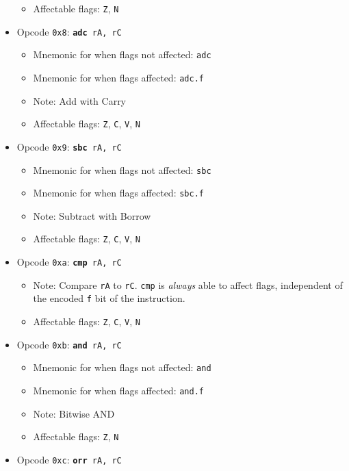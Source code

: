 \documentclass{article}
\begin{document}
\begin{itemize}
\begin{itemize}
			\item Affectable flags:
				\texttt{Z}, \texttt{N}
		\end{itemize}
		\item Opcode \texttt{0x8}:
			\texttt{\textbf{adc} rA, rC}
		\begin{itemize}
			\item Mnemonic for when flags not affected:  \texttt{adc}
			\item Mnemonic for when flags affected:  \texttt{adc.f}
			\item Note:  Add with Carry
			\item Affectable flags:
				\texttt{Z}, \texttt{C}, \texttt{V}, \texttt{N}
		\end{itemize}
		\item Opcode \texttt{0x9}:
			\texttt{\textbf{sbc} rA, rC}
		\begin{itemize}
			\item Mnemonic for when flags not affected:  \texttt{sbc}
			\item Mnemonic for when flags affected:  \texttt{sbc.f}
			\item Note:  Subtract with Borrow
			\item Affectable flags:
				\texttt{Z}, \texttt{C}, \texttt{V}, \texttt{N}
		\end{itemize}
		\item Opcode \texttt{0xa}:
			\texttt{\textbf{cmp} rA, rC}
		\begin{itemize}
			\item Note:  Compare \texttt{rA} to \texttt{rC}.  \texttt{cmp}
			is \textit{always} able to affect flags, independent of the
			encoded \texttt{f} bit of the instruction.
			\item Affectable flags:
				\texttt{Z}, \texttt{C}, \texttt{V}, \texttt{N}
		\end{itemize}
		\item Opcode \texttt{0xb}:
			\texttt{\textbf{and} rA, rC}
		\begin{itemize}
			\item Mnemonic for when flags not affected:  \texttt{and}
			\item Mnemonic for when flags affected:  \texttt{and.f}
			\item Note:  Bitwise AND
			\item Affectable flags:
				\texttt{Z}, \texttt{N}
		\end{itemize}
		\item Opcode \texttt{0xc}:
			\texttt{\textbf{orr} rA, rC}
		\begin{itemize}

\end{itemize}
\end{itemize}
\end{document}
